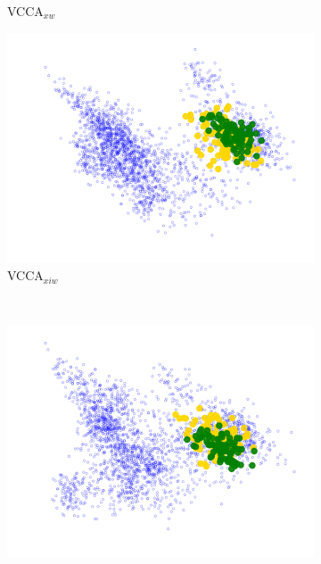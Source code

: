 \begin{figure}[t]
\begin{subfigure}[b]{0.3\textwidth}
         \caption{VCCA$_{x w}$}
         \label{fig:pca_vcca_xw_juice_yoghurt}
     \end{subfigure} 
     \begin{subfigure}[b]{0.3\textwidth}
         \centering
         \includegraphics[width=\textwidth]{PaperB/figures_and_tables/latent_space_visualizations/juice_yoghurt_new/pca_latent_juice_yoghurt_vcca_xiw_seed2.png}
         \caption{VCCA$_{x i w}$}
         \label{fig:pca_vcca_xiw_juice_yoghurt}
     \end{subfigure} \\
     \begin{subfigure}[b]{0.3\textwidth}
         \centering
         \includegraphics[width=\textwidth]{PaperB/figures_and_tables/latent_space_visualizations/juice_yoghurt_new/pca_latent_juice_yoghurt_vcca_xiy_seed2.png}

\end{subfigure}
\end{figure}

